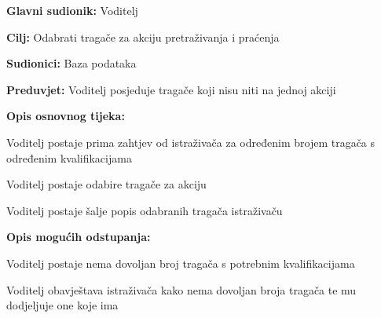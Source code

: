 						\noindent {}
					\begin{packed_item}
						
						\item \textbf{Glavni sudionik: }Voditelj
						\item  \textbf{Cilj:} Odabrati tragače za akciju pretraživanja i praćenja
						\item  \textbf{Sudionici:} Baza podataka
						\item  \textbf{Preduvjet:} Voditelj posjeduje tragače koji nisu niti na jednoj akciji
						\item  \textbf{Opis osnovnog tijeka:}
						
						\item[] \begin{packed_enum}
							
							\item Voditelj postaje prima zahtjev od istraživača za određenim brojem tragača s određenim kvalifikacijama
							\item  Voditelj postaje odabire tragače za akciju
							\item Voditelj postaje šalje popis odabranih tragača istraživaču
							
						\end{packed_enum}
						
						\item  \textbf{Opis mogućih odstupanja:}
						
						\item[] \begin{packed_item}
							
							\item[2.a] Voditelj postaje nema dovoljan broj tragača s potrebnim kvalifikacijama
							\item[] \begin{packed_enum}
								
								\item Voditelj obavještava istraživača kako nema dovoljan broja tragača te mu dodjeljuje one koje ima
								
							\end{packed_enum}
							
						\end{packed_item}
						
					\end{packed_item}
					
					
					
